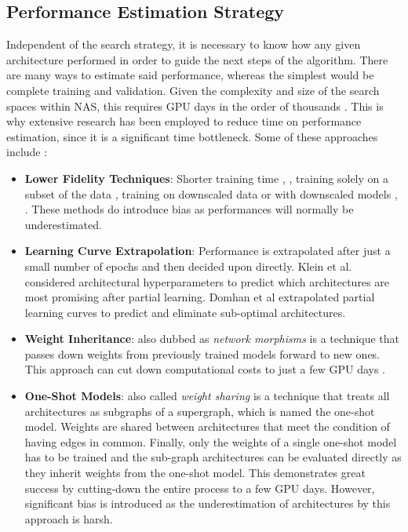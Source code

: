\documentclass[10pt,        %
               a4paper,     %
               journal,     %
               ]{IEEEtran}
\begin{document}
\subsection{Performance Estimation Strategy}
\label{PES}
Independent of the search strategy, it is necessary to know how any given architecture performed in order
to guide the next steps of the algorithm. There are many ways to estimate said performance, whereas the simplest
would be complete training and validation. Given the complexity and size of the search spaces within NAS, this
requires GPU days in the order of thousands \cite{elsken2019neural}. This is why extensive research has been
employed to reduce time on performance estimation, since it is a significant time bottleneck.
Some of these approaches include \cite{elsken2019neural}:
\begin{itemize}
    \item \textbf{Lower Fidelity Techniques}: Shorter training time \cite{zela2018towards}, \cite{zoph2018learning}, training solely on a
        subset of the data \cite{klein2018towards}, training on downscaled data \cite{chrabaszcz2017downsampled} or with downscaled
        models \cite{zoph2018learning}, \cite{pmlr-v70-real17a}. These methods do introduce bias as performances will normally be
        underestimated.

    \item \textbf{Learning Curve Extrapolation}: Performance is extrapolated after just a small number of epochs and then
        decided upon directly. Klein et al. \cite{klein2018towards} considered architectural hyperparameters to predict which
        architectures are most promising after partial learning. Domhan et al \cite{domhan2015speeding} extrapolated partial
        learning curves to predict and eliminate sub-optimal architectures.

    \item \textbf{Weight Inheritance}: also dubbed as \textit{network morphisms} is a technique that passes down weights from
        previously trained models forward to new ones. This approach can cut down computational costs to just a few GPU days
        \cite{cai2018efficient}.

    \item \textbf{One-Shot Models}: also called \textit{weight sharing} is a technique that treats all architectures as subgraphs
        of a supergraph, which is named the one-shot model. Weights are shared between architectures that meet the condition of
        having edges in common. Finally, only the weights of a single one-shot model has to be trained and the
        sub-graph architectures can be evaluated directly as they inherit weights from the one-shot model. This demonstrates great
        success by cutting-down the entire process to a few GPU days. However, significant bias is introduced as the underestimation of architectures by this approach is harsh.
\end{itemize}
\end{document}
